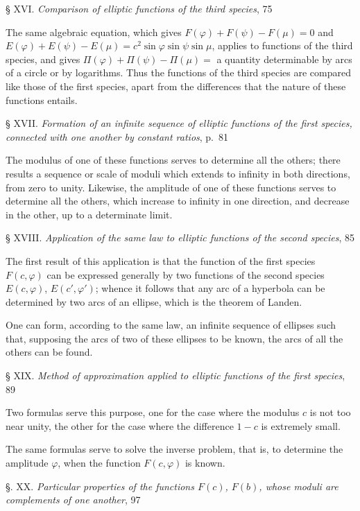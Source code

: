 \documentclass{article}
\begin{document}
§ XVI. \emph{Comparison of elliptic functions of the third species}, 75

The same algebraic equation, which gives $F(\varphi)+F(\psi)-F(\mu)=0$ and $E(\varphi)+E(\psi)-E(\mu)=c^{2}\sin\varphi\sin\psi\sin\mu$, applies to functions of the third species, and gives $\Pi(\varphi)+\Pi(\psi)-\Pi(\mu)=$ a quantity determinable by arcs of a circle or by logarithms. Thus the functions of the third species are compared like those of the first species, apart from the differences that the nature of these functions entails.


§ XVII. \emph{Formation of an infinite sequence of elliptic functions of the first species, connected with one another by constant ratios}, p.~81

The modulus of one of these functions serves to determine all the others; there results a sequence or scale of moduli which extends to infinity in both directions, from zero to unity. Likewise, the amplitude of one of these functions serves to determine all the others, which increase to infinity in one direction, and decrease in the other, up to a determinate limit.

§ XVIII. \emph{Application of the same law to elliptic functions of the second species}, 85

The first result of this application is that the function of the first species $F(c,\varphi)$ can be expressed generally by two functions of the second species $E(c,\varphi)$, $E(c',\varphi')$; whence it follows that any arc of a hyperbola can be determined by two arcs of an ellipse, which is the theorem of Landen.

One can form, according to the same law, an infinite sequence of ellipses such that, supposing the arcs of two of these ellipses to be known, the arcs of all the others can be found.

§ XIX. \emph{Method of approximation applied to elliptic functions of the first species}, 89

Two formulas serve this purpose, one for the case where the modulus $c$ is not too near unity, the other for the case where the difference $1-c$ is extremely small.

The same formulas serve to solve the inverse problem, that is, to determine the amplitude $\varphi$, when the function $F(c,\varphi)$ is known.

§. XX. \emph{Particular properties of the functions $F(c)$, $F(b)$, whose moduli are complements of one another}, 97
\end{document}
